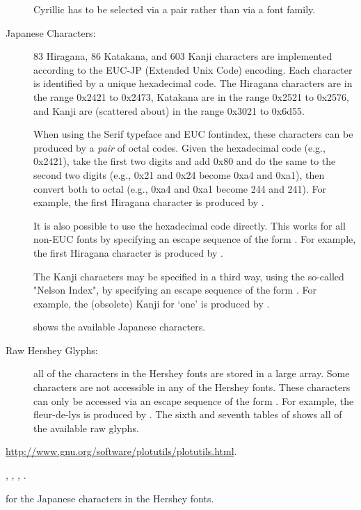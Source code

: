 \begin{Details}
\begin{description}
Cyrillic has to be selected via a  pair
rather than via a font family.


\item[Japanese Characters:] 83 Hiragana, 86 Katakana, and 603 Kanji
characters are implemented according to the EUC-JP (Extended Unix Code)
encoding. Each character is identified by a unique hexadecimal code.
The Hiragana characters
are in the range 0x2421 to 0x2473, Katakana are in the range 0x2521 to
0x2576, and Kanji are (scattered about) in the range 0x3021 to 0x6d55.

When using the Serif typeface and EUC
fontindex, these characters can be produced by a \emph{pair} of octal
codes.  Given the hexadecimal code (e.g., 0x2421), take the first two
digits and add 0x80 and do the same to the second two digits (e.g.,
0x21 and 0x24 become 0xa4 and 0xa1), then convert both to octal (e.g.,
0xa4 and 0xa1 become 244 and 241).  For example, the first Hiragana
character is produced by .

It is also possible to use the hexadecimal code directly.  This works
for all non-EUC fonts by specifying an escape sequence of the form
.  For example, the first Hiragana character is produced
by .

The Kanji characters may be specified in a third way, using the
so-called "Nelson Index", by specifying an escape sequence of the form
.  For example, the (obsolete) Kanji for `one' is
produced by .

 shows the available Japanese characters.


\item[Raw Hershey Glyphs:] all of the characters in the Hershey
fonts are stored in a large array.  Some characters are not
accessible in any of the Hershey fonts.  These characters can only
be accessed via an escape sequence of the form .
For example, the fleur-de-lys is produced by .
The sixth and seventh tables of  shows all of
the available raw glyphs.


\end{description}

\end{Details}
%
\begin{References}\relax
\url{http://www.gnu.org/software/plotutils/plotutils.html}.
\end{References}
%
\begin{SeeAlso}\relax
 , ,
, .

 for the Japanese characters in the Hershey fonts.
\end{SeeAlso}

